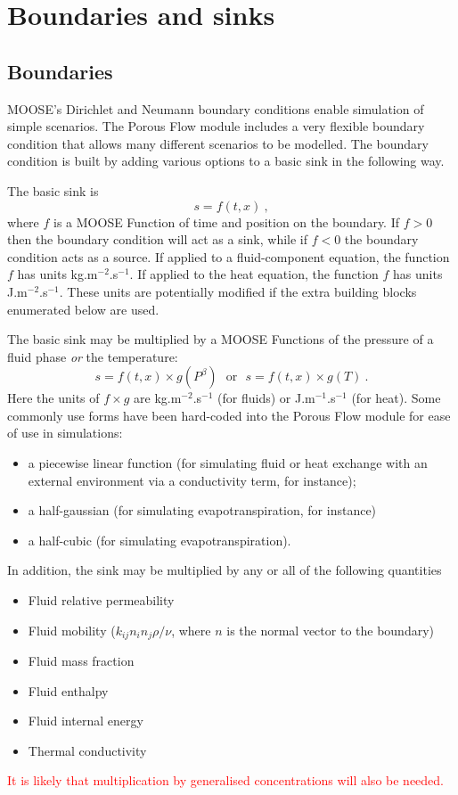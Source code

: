 \documentclass[12pt]{report}
\begin{document}
\chapter{Boundaries and sinks}

\section{Boundaries}

MOOSE's Dirichlet and Neumann boundary conditions enable simulation of
simple scenarios.  The Porous Flow module includes a very flexible
boundary condition that allows many different scenarios to be
modelled.  The boundary condition is built by adding various options
to a basic sink in the following way.

The basic sink is
\begin{equation}
s = f(t, x) \ ,
\end{equation}
where $f$ is a MOOSE Function of time and position on the boundary.
If $f>0$ then the boundary condition will act as a sink, while if
$f<0$ the boundary condition acts as a source.  If applied to a
fluid-component equation, the function $f$ has units
kg.m$^{-2}$.s$^{-1}$.  If applied to the heat equation, the function
$f$ has units J.m$^{-2}$.s$^{-1}$.  These units are potentially
modified if the extra building blocks enumerated below are used.

The basic sink may be multiplied by a MOOSE Functions of the pressure
of a fluid phase {\em or} the temperature:
\begin{equation}
s = f(t, x) \times g(P^{\beta}) \ \ \ \mbox{or}\ \ \ s = f(t, x)
\times g(T) \ .
\end{equation}
Here the units of $f\times g$ are kg.m$^{-2}$.s$^{-1}$ (for fluids) or
J.m$^{-1}$.s$^{-1}$ (for heat).  Some commonly use forms have been
hard-coded into the Porous Flow module for ease of use in simulations:
\begin{itemize}
\item a piecewise linear function (for simulating fluid or heat
  exchange with an external environment via a conductivity term, for instance);
\item a half-gaussian (for simulating evapotranspiration, for
  instance)
\item a half-cubic (for simulating evapotranspiration).
\end{itemize}

In addition, the sink may be multiplied by any or all of the following
quantities
\begin{itemize}
\item Fluid relative permeability
\item Fluid mobility ($k_{ij}n_{i}n_{j} \rho / \nu$, where $n$ is the
  normal vector to the boundary)
\item Fluid mass fraction
\item Fluid enthalpy
\item Fluid internal energy
\item Thermal conductivity
\end{itemize}
\textcolor{red}{It is likely that multiplication by generalised
  concentrations will also be needed.}
\end{document}
